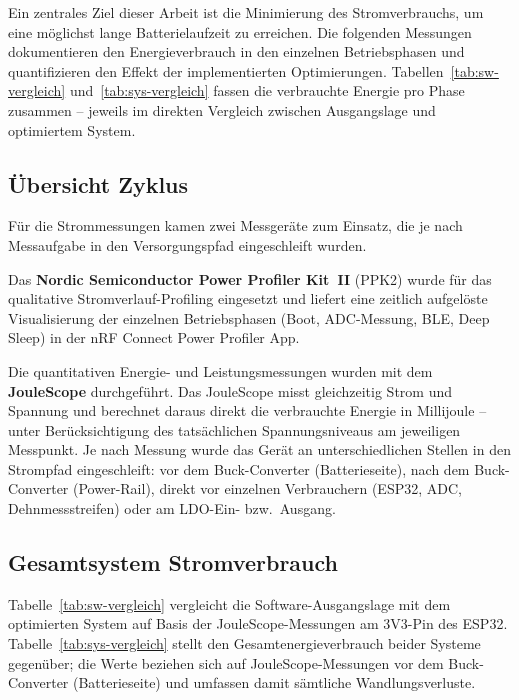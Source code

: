 \documentclass[12pt,a4paper]{article}
\begin{document}
	Ein zentrales Ziel dieser Arbeit ist die Minimierung des Stromverbrauchs, um eine möglichst lange Batterielaufzeit zu erreichen.
	Die folgenden Messungen dokumentieren den Energieverbrauch in den einzelnen Betriebsphasen und quantifizieren den Effekt der implementierten Optimierungen.
	Tabellen~\ref{tab:sw-vergleich} und~\ref{tab:sys-vergleich} fassen die verbrauchte Energie pro Phase zusammen -- jeweils im direkten Vergleich zwischen Ausgangslage und optimiertem System.

	\subsection{Übersicht Zyklus}

	Für die Strommessungen kamen zwei Messgeräte zum Einsatz, die je nach Messaufgabe in den Versorgungspfad eingeschleift wurden.

	Das \textbf{Nordic Semiconductor Power Profiler Kit~II} (PPK2) wurde für das qualitative Stromverlauf-Profiling eingesetzt und liefert eine zeitlich aufgelöste Visualisierung der einzelnen Betriebsphasen (Boot, ADC-Messung, BLE, Deep Sleep) in der nRF Connect Power Profiler App.

	Die quantitativen Energie- und Leistungsmessungen wurden mit dem \textbf{JouleScope} durchgeführt.
	Das JouleScope misst gleichzeitig Strom und Spannung und berechnet daraus direkt die verbrauchte Energie in Millijoule -- unter Berücksichtigung des tatsächlichen Spannungsniveaus am jeweiligen Messpunkt.
	Je nach Messung wurde das Gerät an unterschiedlichen Stellen in den Strompfad eingeschleift: vor dem Buck-Converter (Batterieseite), nach dem Buck-Converter (Power-Rail), direkt vor einzelnen Verbrauchern (ESP32, ADC, Dehnmessstreifen) oder am LDO-Ein- bzw.\ Ausgang.

	\subsection{Gesamtsystem Stromverbrauch}

	Tabelle~\ref{tab:sw-vergleich} vergleicht die Software-Ausgangslage mit dem optimierten System auf Basis der JouleScope-Messungen am 3V3-Pin des ESP32.
	Tabelle~\ref{tab:sys-vergleich} stellt den Gesamtenergieverbrauch beider Systeme gegenüber; die Werte beziehen sich auf JouleScope-Messungen vor dem Buck-Converter (Batterieseite) und umfassen damit sämtliche Wandlungsverluste.
	
\end{document}
